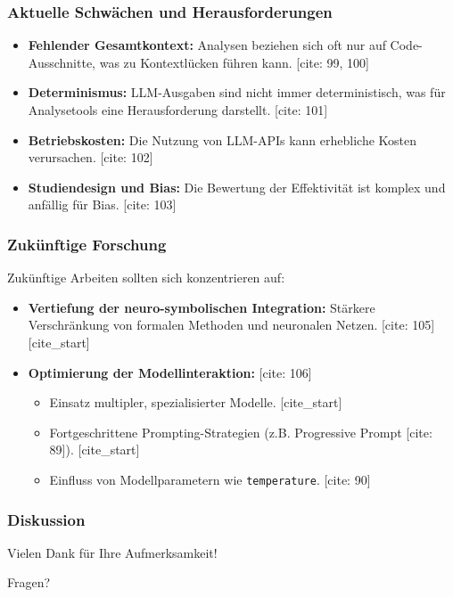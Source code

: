 \documentclass{beamer}
\begin{document}
\begin{frame}
\frametitle{Aktuelle Schwächen und Herausforderungen}
\begin{itemize}
    [cite_start]\item \textbf{Fehlender Gesamtkontext:} Analysen beziehen sich oft nur auf Code-Ausschnitte, was zu Kontextlücken führen kann. [cite: 99, 100] \item \textbf{Determinismus:} LLM-Ausgaben sind nicht immer deterministisch, was für Analysetools eine Herausforderung darstellt. [cite: 101] \item \textbf{Betriebskosten:} Die Nutzung von LLM-APIs kann erhebliche Kosten verursachen. [cite: 102] \item \textbf{Studiendesign und Bias:} Die Bewertung der Effektivität ist komplex und anfällig für Bias. [cite: 103]
\end{itemize}
\end{frame}

\begin{frame}
\frametitle{Zukünftige Forschung}
\begin{examples}
Zukünftige Arbeiten sollten sich konzentrieren auf:
\begin{itemize}
    [cite_start]\item \textbf{Vertiefung der neuro-symbolischen Integration:} Stärkere Verschränkung von formalen Methoden und neuronalen Netzen. [cite: 105]
    [cite_start]\item \textbf{Optimierung der Modellinteraktion:} [cite: 106]
    \begin{itemize}
        \item Einsatz multipler, spezialisierter Modelle.
        [cite_start]\item Fortgeschrittene Prompting-Strategien (z.B. Progressive Prompt [cite: 89]).
        [cite_start]\item Einfluss von Modellparametern wie \texttt{temperature}. [cite: 90]
    \end{itemize}
\end{itemize}
\end{examples}
\end{frame}

\begin{frame}
    \frametitle{Diskussion}
    \begin{center}
        \huge
        Vielen Dank für Ihre Aufmerksamkeit!
        \vspace{1cm}
        
        \Large
        Fragen?
    \end{center}
\end{frame}
\end{document}
